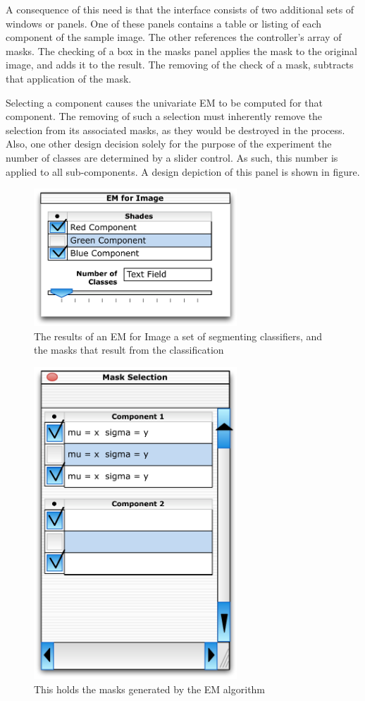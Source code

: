 \documentclass[11pt]{article}
\begin{document}
A consequence of this need is that the interface consists of two additional sets of windows or panels.  One of these panels contains a table or listing of each component of the sample image.  The other references the controller's array of masks.  The checking of a box in the masks panel applies the mask to the original image, and adds it to the result.  The removing of the check of a mask, subtracts that application of the mask.  

Selecting a component causes the univariate EM to be computed for that component.  The removing of such a selection must inherently remove the selection from its associated masks, as they would be destroyed in the process.  Also, one other design decision solely for the purpose of the experiment the number of classes are determined by a slider control.  As such, this number is applied to all sub-components.  A design depiction of this panel is shown in figure.
\begin{figure}[htbp] %
   \centering
   \includegraphics[width=3in]{emComponentSelection.pdf} 
   \caption{The results of an EM for Image
a set of segmenting classifiers, and the 
masks that result from the classification}
   \label{emComponentSelection}
\end{figure}
  


\begin{figure}[htbp] %
   \centering
   \includegraphics[width=3in]{maskSelector.pdf} 
   \caption{This holds the masks generated by the EM algorithm}
   \label{maskSelector}
\end{figure}
\end{document}
